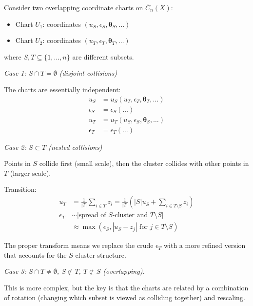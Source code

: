\begin{proposition}\label{prop:transition-functions}
Consider two overlapping coordinate charts on $\overline{C}_n(X)$:
\begin{itemize}
\item Chart $U_1$: coordinates $(u_S, \epsilon_S, \boldsymbol{\theta}_S, \ldots)$
\item Chart $U_2$: coordinates $(u_T, \epsilon_T, \boldsymbol{\theta}_T, \ldots)$
\end{itemize}

where $S, T \subseteq \{1,\ldots,n\}$ are different subsets.

\emph{Case 1: $S \cap T = \emptyset$ (disjoint collisions)}

The charts are essentially independent:
\begin{align}
u_S &= u_S(u_T, \epsilon_T, \boldsymbol{\theta}_T, \ldots)\\
\epsilon_S &= \epsilon_S(\ldots) \\
u_T &= u_T(u_S, \epsilon_S, \boldsymbol{\theta}_S, \ldots)\\
\epsilon_T &= \epsilon_T(\ldots)
\end{align}

\emph{Case 2: $S \subset T$ (nested collisions)}

Points in $S$ collide first (small scale), then the cluster collides with other points
in $T$ (larger scale).

Transition:
\begin{align}
u_T &= \frac{1}{|T|} \sum_{i \in T} z_i = \frac{1}{|T|}\left( |S| u_S + \sum_{i \in T \setminus S} z_i \right)\\
\epsilon_T &\sim |\text{spread of } S \text{-cluster and } T\setminus S| \\
&\approx \max(\epsilon_S, |u_S - z_j| \text{ for } j \in T\setminus S)
\end{align}

The proper transform means we replace the crude $\epsilon_T$ with a more refined version
that accounts for the $S$-cluster structure.

\emph{Case 3: $S \cap T \neq \emptyset$, $S \not\subset T$, $T \not\subset S$ (overlapping).}

This is more complex, but the key is that the charts are related by a combination of
rotation (changing which subset is viewed as colliding together) and rescaling.
\end{proposition}

